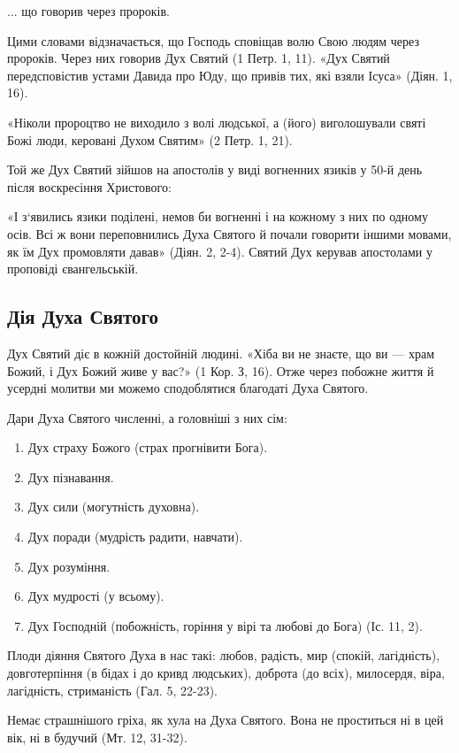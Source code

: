 \documentclass[main.tex]{subfiles}
\begin{document}
... що говорив через пророків.

Цими словами відзначається, що Господь сповіщав волю Свою людям через пророків. Через них говорив Дух Святий (1 Петр. 1, 11). «Дух Святий передсповістив устами Давида про Юду, що привів тих, які взяли Ісуса» (Діян. 1, 16).

«Ніколи пророцтво не виходило з волі людської, а (його) виголошували святі Божі люди, керовані Духом Святим» (2 Петр. 1, 21).

Той же Дух Святий зійшов на апостолів у виді вогненних язиків у 50-й день після воскресіння Христового:

«І з`явились язики поділені, немов би вогненні і на кожному з них по одному осів. Всі ж вони переповнились Духа Святого й почали говорити іншими мовами, як їм Дух промовляти давав» (Діян. 2, 2-4). Святий Дух керував апостолами у проповіді євангельській.

\subsection{Дія Духа Святого}

Дух Святий діє в кожній достойній людині. «Хіба ви не знаєте, що ви — храм Божий, і Дух Божий живе у вас?» (1 Кор. З, 16). Отже через побожне життя й усердні молитви ми можемо сподоблятися благодаті Духа Святого.

Дари Духа Святого численні, а головніші з них сім:
\begin{enumerate}
    \item Дух страху Божого (страх прогнівити Бога).
    \item Дух пізнавання.
    \item Дух сили (могутність духовна).
    \item Дух поради (мудрість радити, навчати).
    \item Дух розуміння.
    \item Дух мудрості (у всьому).
    \item Дух Господній (побожність, горіння у вірі та любові до Бога) (Іс. 11, 2).
\end{enumerate}

Плоди діяння Святого Духа в нас такі: любов, радість, мир (спокій, лагідність), довготерпіння (в бідах і до кривд людських), доброта (до всіх), милосердя, віра, лагідність, стриманість (Гал. 5, 22-23).

Немає страшнішого гріха, як хула на Духа Святого. Вона не проститься ні в цей вік, ні в будучий (Мт. 12, 31-32).
 
\end{document}
